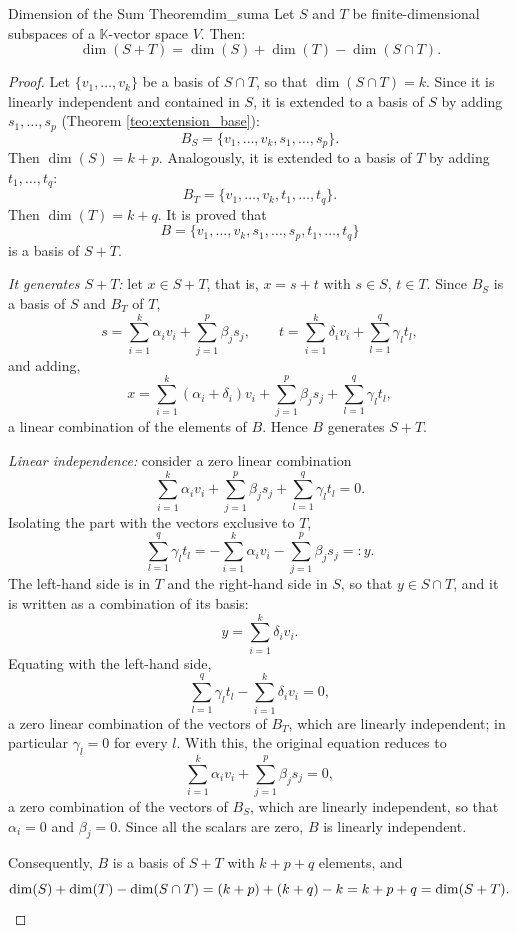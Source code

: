 \documentclass[11pt, a4paper]{article}
\begin{document}
\begin{teorema}{Dimension of the Sum Theorem}{dim_suma}
Let $S$ and $T$ be finite-dimensional subspaces of a $\mathbb{K}$-vector space $V$. Then:
\[
\dim(S+T) = \dim(S) + \dim(T) - \dim(S \cap T).
\]
\end{teorema}

\begin{proof}
Let $\{v_1, \dots, v_k\}$ be a basis of $S \cap T$, so that $\dim(S \cap T) = k$. Since it is linearly independent and contained in $S$, it is extended to a basis of $S$ by adding $s_1, \dots, s_p$ (Theorem \ref{teo:extension_base}):
\[
B_S = \{v_1, \dots, v_k, s_1, \dots, s_p\}.
\]
Then $\dim(S) = k + p$. Analogously, it is extended to a basis of $T$ by adding $t_1, \dots, t_q$:
\[
B_T = \{v_1, \dots, v_k, t_1, \dots, t_q\}.
\]
Then $\dim(T) = k + q$. It is proved that
\[
B = \{v_1, \dots, v_k, s_1, \dots, s_p, t_1, \dots, t_q\}
\]
is a basis of $S+T$.

\textit{It generates $S+T$:} let $x \in S+T$, that is, $x = s + t$ with $s \in S$, $t \in T$. Since $B_S$ is a basis of $S$ and $B_T$ of $T$,
\[
s = \sum_{i=1}^{k} \alpha_i v_i + \sum_{j=1}^{p} \beta_j s_j, \qquad
t = \sum_{i=1}^{k} \delta_i v_i + \sum_{l=1}^{q} \gamma_l t_l,
\]
and adding,
\[
x = \sum_{i=1}^{k} (\alpha_i + \delta_i) v_i + \sum_{j=1}^{p} \beta_j s_j + \sum_{l=1}^{q} \gamma_l t_l,
\]
a linear combination of the elements of $B$. Hence $B$ generates $S+T$.

\textit{Linear independence:} consider a zero linear combination
\[
\sum_{i=1}^k \alpha_i v_i + \sum_{j=1}^p \beta_j s_j + \sum_{l=1}^q \gamma_l t_l = 0.
\]
Isolating the part with the vectors exclusive to $T$,
\[
\sum_{l=1}^q \gamma_l t_l = - \sum_{i=1}^k \alpha_i v_i - \sum_{j=1}^p \beta_j s_j =: y.
\]
The left-hand side is in $T$ and the right-hand side in $S$, so that $y \in S \cap T$, and it is written as a combination of its basis:
\[
y = \sum_{i=1}^k \delta_i v_i.
\]
Equating with the left-hand side,
\[
\sum_{l=1}^q \gamma_l t_l - \sum_{i=1}^k \delta_i v_i = 0,
\]
a zero linear combination of the vectors of $B_T$, which are linearly independent; in particular $\gamma_l = 0$ for every $l$. With this, the original equation reduces to
\[
\sum_{i=1}^k \alpha_i v_i + \sum_{j=1}^p \beta_j s_j = 0,
\]
a zero combination of the vectors of $B_S$, which are linearly independent, so that $\alpha_i = 0$ and $\beta_j = 0$. Since all the scalars are zero, $B$ is linearly independent.

Consequently, $B$ is a basis of $S+T$ with $k + p + q$ elements, and
\[
\dim(S) + \dim(T) - \dim(S \cap T) = (k+p) + (k+q) - k = k + p + q = \dim(S+T). \qedhere
\]
\end{proof}
\end{document}
